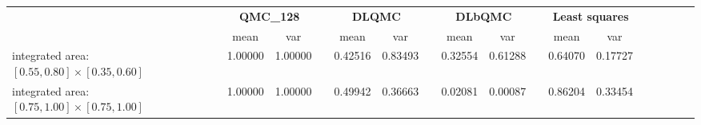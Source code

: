 \begin{tabular}{lcccccccccccccccc}
\toprule
 &\multicolumn{2}{c}{\textbf{QMC\_128}}&&\multicolumn{2}{c}{\textbf{DLQMC}}&&\multicolumn{2}{c}{\textbf{DLbQMC}}&&\multicolumn{2}{c}{\textbf{Least squares}}\\ 
\cmidrule(r){2-3} \cmidrule(r){5-6} \cmidrule(r){8-9}
 &mean&var&&mean&var&&mean&var&&mean&var\\ 
\midrule
integrated area: $[0.55,0.80]\times [0.35,0.60]$ &1.00000&1.00000&&0.42516&0.83493&&0.32554&0.61288&&0.64070&0.17727\\ 
integrated area: $[0.75,1.00]\times [0.75,1.00]$ &1.00000&1.00000&&0.49942&0.36663&&0.02081&0.00087&&0.86204&0.33454\\ 
\bottomrule
\end{tabular}

